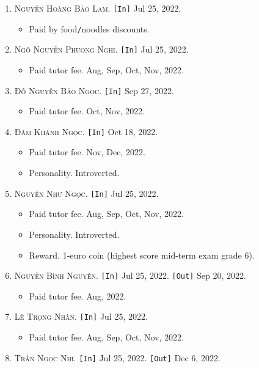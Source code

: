 \documentclass{article}
\numberwithin{equation}{section}
\begin{document}
\begin{enumerate}
\begin{itemize}
	\end{itemize}
	\item \textsc{Nguyễn Hoàng Bảo Lam.} \texttt{[In]} Jul 25, 2022.
	\begin{itemize}
		\item \textsf{Paid by food\texttt{/}noodles discounts.}
	\end{itemize}
	\item \textsc{Ngô Nguyễn Phương Nghi.} \texttt{[In]} Jul 25, 2022.
	\begin{itemize}
		\item \textsf{Paid tutor fee.} Aug, Sep, Oct, Nov, 2022.
	\end{itemize}
	\item \textsc{Đỗ Nguyễn Bảo Ngọc.} \texttt{[In]} Sep 27, 2022.
	\begin{itemize}
		\item \textsf{Paid tutor fee.} Oct, Nov, 2022.
	\end{itemize}
	\item \textsc{Đàm Khánh Ngọc.} \texttt{[In]} Oct 18, 2022.
	\begin{itemize}
		\item \textsf{Paid tutor fee.} Nov, Dec, 2022.
		\item \textsf{Personality.} Introverted.
	\end{itemize}
	\item \textsc{Nguyễn Như Ngọc.} \texttt{[In]} Jul 25, 2022.
	\begin{itemize}
		\item \textsf{Paid tutor fee.} Aug, Sep, Oct, Nov, 2022.
		\item \textsf{Personality.} Introverted.
		\item \textsf{Reward.} 1-euro coin (highest score mid-term exam grade 6).
	\end{itemize}
	\item \textsc{Nguyễn Bình Nguyên.} \texttt{[In]} Jul 25, 2022. \texttt{[Out]} Sep 20, 2022.
	\begin{itemize}
		\item \textsf{Paid tutor fee.} Aug, 2022.
	\end{itemize}
	\item \textsc{Lê Trọng Nhân.} \texttt{[In]} Jul 25, 2022.
	\begin{itemize}
		\item \textsf{Paid tutor fee.} Aug, Sep, Oct, Nov, 2022.
	\end{itemize}
	\item \textsc{Trần Ngọc Nhi.} \texttt{[In]} Jul 25, 2022. \texttt{[Out]} Dec 6, 2022.

\end{enumerate}
\end{document}
